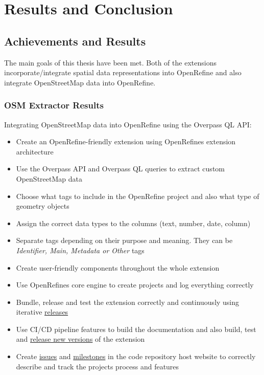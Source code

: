 \chapter{Results and Conclusion}\label{ch:results-&-conclusion}
\section{Achievements and Results}
The main goals of this thesis have been met. Both of the extensions incorporate/integrate spatial data representations into OpenRefine and also integrate OpenStreetMap data into OpenRefine.
\subsection{OSM Extractor Results}
Integrating OpenStreetMap data into OpenRefine using the Overpass QL API:
\begin{itemize}
    \item Create an OpenRefine-friendly extension using OpenRefine\textquotesingle s extension architecture
    \item Use the Overpass API and Overpass QL queries to extract custom OpenStreetMap data
    \item Choose what tags to include in the OpenRefine project and also what type of geometry objects
    \item Assign the correct data types to the columns (text, number, date, column)
    \item Separate tags depending on their purpose and meaning. They can be \textit{Identifier, Main, Metadata or Other} tags
    \item Create user-friendly components throughout the whole extension
    \item Use OpenRefine\textquotesingle s core engine to create projects and log everything correctly
    \item Bundle, release and test the extension correctly and continuously using iterative \href{https://gitlab.com/labiangashi/osm-extractor/-/releases}{releases}
    \item Use CI/CD pipeline features to build the documentation and also build, test and \href{https://gitlab.com/labiangashi/osm-extractor/-/releases}{release new versions} of the extension
    \item Create \href{https://gitlab.com/labiangashi/osm-extractor/-/issues}{issues} and
    \href{https://gitlab.com/labiangashi/osm-extractor/-/milestones}{milestones} in the code repository host website to correctly describe and
    track the project\textquotesingle s process and features
\end{itemize}
